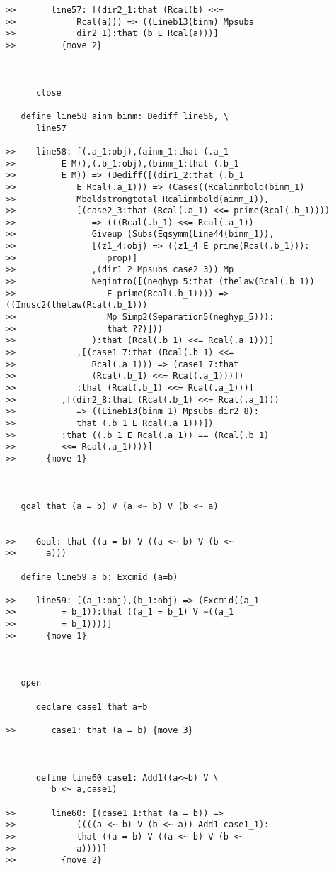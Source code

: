 \documentclass[12pt]{article}
\begin{document}
\begin{verbatim}
>>       line57: [(dir2_1:that (Rcal(b) <<=
>>            Rcal(a))) => ((Lineb13(binm) Mpsubs
>>            dir2_1):that (b E Rcal(a)))]
>>         {move 2}



      close

   define line58 ainm binm: Dediff line56, \
      line57

>>    line58: [(.a_1:obj),(ainm_1:that (.a_1
>>         E M)),(.b_1:obj),(binm_1:that (.b_1
>>         E M)) => (Dediff([(dir1_2:that (.b_1
>>            E Rcal(.a_1))) => (Cases((Rcalinmbold(binm_1)
>>            Mboldstrongtotal Rcalinmbold(ainm_1)),
>>            [(case2_3:that (Rcal(.a_1) <<= prime(Rcal(.b_1))))
>>               => (((Rcal(.b_1) <<= Rcal(.a_1))
>>               Giveup (Subs(Eqsymm(Line44(binm_1)),
>>               [(z1_4:obj) => ((z1_4 E prime(Rcal(.b_1))):
>>                  prop)]
>>               ,(dir1_2 Mpsubs case2_3)) Mp
>>               Negintro([(neghyp_5:that (thelaw(Rcal(.b_1))
>>                  E prime(Rcal(.b_1)))) => ((Inusc2(thelaw(Rcal(.b_1)))
>>                  Mp Simp2(Separation5(neghyp_5))):
>>                  that ??)]))
>>               ):that (Rcal(.b_1) <<= Rcal(.a_1)))]
>>            ,[(case1_7:that (Rcal(.b_1) <<=
>>               Rcal(.a_1))) => (case1_7:that
>>               (Rcal(.b_1) <<= Rcal(.a_1)))])
>>            :that (Rcal(.b_1) <<= Rcal(.a_1)))]
>>         ,[(dir2_8:that (Rcal(.b_1) <<= Rcal(.a_1)))
>>            => ((Lineb13(binm_1) Mpsubs dir2_8):
>>            that (.b_1 E Rcal(.a_1)))])
>>         :that ((.b_1 E Rcal(.a_1)) == (Rcal(.b_1)
>>         <<= Rcal(.a_1))))]
>>      {move 1}



   goal that (a = b) V (a <~ b) V (b <~ a)


>>    Goal: that ((a = b) V ((a <~ b) V (b <~
>>      a)))

   define line59 a b: Excmid (a=b)

>>    line59: [(a_1:obj),(b_1:obj) => (Excmid((a_1
>>         = b_1)):that ((a_1 = b_1) V ~((a_1
>>         = b_1))))]
>>      {move 1}



   open

      declare case1 that a=b

>>       case1: that (a = b) {move 3}



      define line60 case1: Add1((a<~b) V \
         b <~ a,case1)

>>       line60: [(case1_1:that (a = b)) =>
>>            ((((a <~ b) V (b <~ a)) Add1 case1_1):
>>            that ((a = b) V ((a <~ b) V (b <~
>>            a))))]
>>         {move 2}




\end{verbatim}
\end{document}
